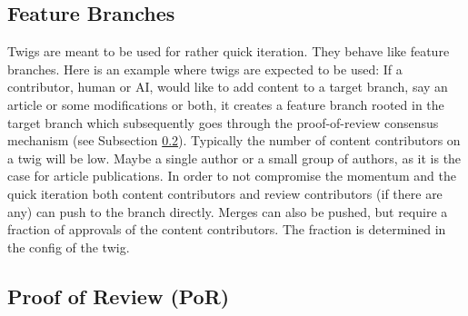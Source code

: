 \subsection{Feature Branches}
\label{ssc:twiglocalconsensus}

Twigs are meant to be used for rather quick iteration. They behave like feature branches. Here is an example where twigs are expected to be used: If a contributor, human or AI, would like to add content to a target branch, say an article or some modifications or both, it creates a feature branch rooted in the target branch which subsequently goes through the proof-of-review consensus mechanism (see Subsection \ref{ssc:por}). Typically the number of content contributors on a twig will be low. Maybe a single author or a small group of authors, as it is the case for article publications. In order to not compromise the momentum and the quick iteration both content contributors and review contributors (if there are any) can push to the branch directly. Merges can also be pushed, but require a fraction of approvals of the content contributors. The fraction is determined in the config of the twig. 

\subsection{Proof of Review (PoR)}
\label{ssc:por}

